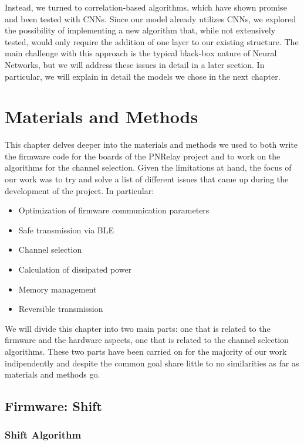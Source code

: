 \documentclass{Configuration_Files/PoliMi3i_thesis}
\begin{document}
Instead, we turned to correlation-based algorithms, which have shown promise and been tested with CNNs. Since our model already utilizes CNNs, we explored the possibility of implementing a new algorithm that, while not extensively tested, would only require the addition of one layer to our existing structure. The main challenge with this approach is the typical black-box nature of Neural Networks, but we will address these issues in detail in a later section.
In particular, we will explain in detail the models we chose in the next chapter.


\chapter{Materials and Methods}
This chapter delves deeper into the materials and methods we used to both write the firmware code for the boards of the PNRelay project and to work on the algorithms for the channel selection.
Given the limitations at hand, the focus of our work was to try and solve a list of different issues that came up during the development of the project.
In particular:

\begin{itemize}
	\item Optimization of firmware communication parameters
	\item Safe transmission via BLE
	\item Channel selection
	\item Calculation of dissipated power
	\item Memory management
	\item Reversible transmission
\end{itemize}

We will divide this chapter into two main parts: one that is related to the firmware and the hardware aspects, one that is related to the channel selection algorithms.
These two parts have been carried on for the majority of our work indipendently and despite the common goal share little to no similarities as far as materials and methods go.

\section{Firmware: Shift}

\subsection{Shift Algorithm}
\end{document}
